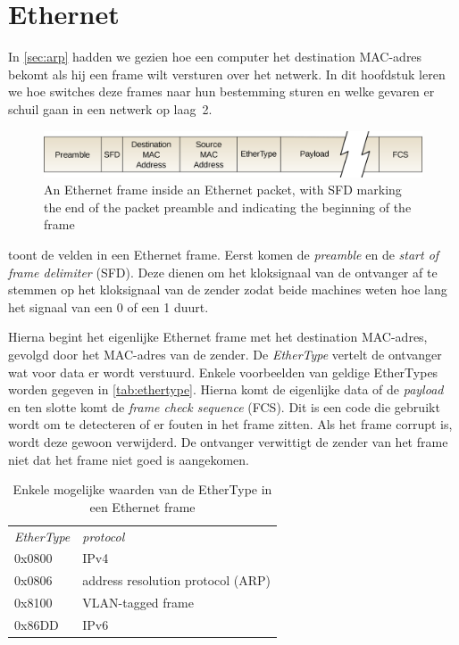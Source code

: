 \chapter{Ethernet}
\label{sec:ethernet}

In \vref{sec:arp} hadden we gezien hoe een computer het destination MAC-adres bekomt als hij een frame wilt versturen over het netwerk.
In dit hoofdstuk leren we hoe switches deze frames naar hun bestemming sturen en welke gevaren er schuil gaan in een netwerk op laag~2.


\begin{figure}[hbp]
    \centering
    \includegraphics[width=\textwidth]{images/Ethernet_frame.png}
    \caption{An Ethernet frame inside an Ethernet packet, with SFD marking the end of the packet preamble and indicating the beginning of the frame}
    \label{fig:ethernet-frame}
\end{figure}


 toont de velden in een Ethernet frame.
Eerst komen de \emph{preamble} en de \emph{start of frame delimiter} (SFD).
Deze dienen om het kloksignaal van de ontvanger af te stemmen op het kloksignaal van de zender zodat beide machines weten hoe lang het signaal van een 0 of een 1 duurt.

Hierna begint het eigenlijke Ethernet frame met het destination MAC-adres, gevolgd door het MAC-adres van de zender.
De \emph{EtherType} vertelt de ontvanger wat voor data er wordt verstuurd.
Enkele voorbeelden van geldige EtherTypes worden gegeven in \vref{tab:ethertype}.
Hierna komt de eigenlijke data of de \emph{payload} en ten slotte komt de \emph{frame check sequence} (FCS).
Dit is een code die gebruikt wordt om te detecteren of er fouten in het frame zitten.
Als het frame corrupt is, wordt deze gewoon verwijderd.
De ontvanger verwittigt de zender van het frame niet dat het frame niet goed is aangekomen.

\begin{table}[htp]
    \centering
    \begin{tabular}{ll}
    \textit{EtherType} & \textit{protocol} \\[1ex]
    0x0800 & IPv4 \\
    0x0806 & address resolution protocol (ARP) \\
    0x8100 & VLAN-tagged frame \\
    0x86DD & IPv6 \\
    \end{tabular}
    \caption{Enkele mogelijke waarden van de EtherType in een Ethernet frame}
    \label{tab:ethertype}
\end{table}


